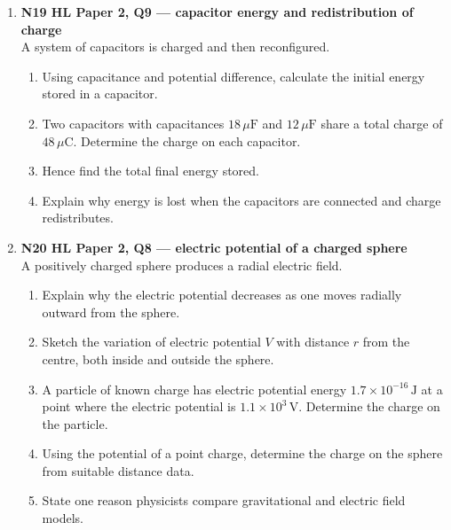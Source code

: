 \documentclass[11pt]{article}
\begin{document}
\begin{enumerate}[leftmargin=*, itemsep=1.2em]
\item \textbf{N19 HL Paper 2, Q9 --- capacitor energy and redistribution of charge}\\
A system of capacitors is charged and then reconfigured.
\begin{enumerate}[label=(\alph*)]
\item Using capacitance and potential difference, calculate the initial energy stored in a capacitor.
\item Two capacitors with capacitances $18\,\mu\text{F}$ and $12\,\mu\text{F}$ share a total charge of $48\,\mu\text{C}$. Determine the charge on each capacitor.
\item Hence find the total final energy stored.
\item Explain why energy is lost when the capacitors are connected and charge redistributes.
\end{enumerate}

\item \textbf{N20 HL Paper 2, Q8 --- electric potential of a charged sphere}\\
A positively charged sphere produces a radial electric field.
\begin{enumerate}[label=(\alph*)]
\item Explain why the electric potential decreases as one moves radially outward from the sphere.
\item Sketch the variation of electric potential $V$ with distance $r$ from the centre, both inside and outside the sphere.
\item A particle of known charge has electric potential energy $1.7\times 10^{-16}\,\text{J}$ at a point where the electric potential is $1.1\times 10^3\,\text{V}$. Determine the charge on the particle.
\item Using the potential of a point charge, determine the charge on the sphere from suitable distance data.
\item State one reason physicists compare gravitational and electric field models.
\end{enumerate}

\end{enumerate}
\end{document}
